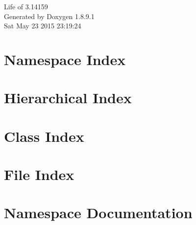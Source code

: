 \documentclass[twoside]{book}
\newcommand{\+}{\discretionary{\mbox{\scriptsize$\hookleftarrow$}}{}{}}
\newcommand{\clearemptydoublepage}{%
  \newpage{\pagestyle{empty}\cleardoublepage}%
}
\begin{document}
\hypersetup{pageanchor=false,
             bookmarks=true,
             bookmarksnumbered=true,
             pdfencoding=unicode
            }
\begin{titlepage}
\vspace*{7cm}
\begin{center}%
{\Large Life of 3.14159 }\\
\vspace*{1cm}
{\large Generated by Doxygen 1.8.9.1}\\
\vspace*{0.5cm}
{\small Sat May 23 2015 23:19:24}\\
\end{center}
\end{titlepage}
\clearemptydoublepage
\tableofcontents
\clearemptydoublepage
{}
\hypersetup{pageanchor=true}

\chapter{Namespace Index}

\chapter{Hierarchical Index}

\chapter{Class Index}

\chapter{File Index}

\chapter{Namespace Documentation}
















\end{document}
